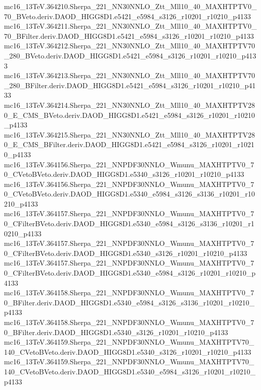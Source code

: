 \begin{scriptsize}
mc16\_13TeV.364210.Sherpa\_221\_NN30NNLO\_Ztt\_Mll10\_40\_MAXHTPTV0\_70\_BVeto.deriv.DAOD\_HIGG8D1.e5421\_e5984\_s3126\_r10201\_r10210\_p4133 \\
mc16\_13TeV.364211.Sherpa\_221\_NN30NNLO\_Ztt\_Mll10\_40\_MAXHTPTV0\_70\_BFilter.deriv.DAOD\_HIGG8D1.e5421\_e5984\_s3126\_r10201\_r10210\_p4133 \\
mc16\_13TeV.364212.Sherpa\_221\_NN30NNLO\_Ztt\_Mll10\_40\_MAXHTPTV70\_280\_BVeto.deriv.DAOD\_HIGG8D1.e5421\_e5984\_s3126\_r10201\_r10210\_p4133 \\
mc16\_13TeV.364213.Sherpa\_221\_NN30NNLO\_Ztt\_Mll10\_40\_MAXHTPTV70\_280\_BFilter.deriv.DAOD\_HIGG8D1.e5421\_e5984\_s3126\_r10201\_r10210\_p4133 \\
mc16\_13TeV.364214.Sherpa\_221\_NN30NNLO\_Ztt\_Mll10\_40\_MAXHTPTV280\_E\_CMS\_BVeto.deriv.DAOD\_HIGG8D1.e5421\_e5984\_s3126\_r10201\_r10210\_p4133 \\
mc16\_13TeV.364215.Sherpa\_221\_NN30NNLO\_Ztt\_Mll10\_40\_MAXHTPTV280\_E\_CMS\_BFilter.deriv.DAOD\_HIGG8D1.e5421\_e5984\_s3126\_r10201\_r10210\_p4133 \\
mc16\_13TeV.364156.Sherpa\_221\_NNPDF30NNLO\_Wmunu\_MAXHTPTV0\_70\_CVetoBVeto.deriv.DAOD\_HIGG8D1.e5340\_s3126\_r10201\_r10210\_p4133 \\
mc16\_13TeV.364156.Sherpa\_221\_NNPDF30NNLO\_Wmunu\_MAXHTPTV0\_70\_CVetoBVeto.deriv.DAOD\_HIGG8D1.e5340\_e5984\_s3126\_s3136\_r10201\_r10210\_p4133 \\
mc16\_13TeV.364157.Sherpa\_221\_NNPDF30NNLO\_Wmunu\_MAXHTPTV0\_70\_CFilterBVeto.deriv.DAOD\_HIGG8D1.e5340\_e5984\_s3126\_s3136\_r10201\_r10210\_p4133 \\
mc16\_13TeV.364157.Sherpa\_221\_NNPDF30NNLO\_Wmunu\_MAXHTPTV0\_70\_CFilterBVeto.deriv.DAOD\_HIGG8D1.e5340\_s3126\_r10201\_r10210\_p4133 \\
mc16\_13TeV.364157.Sherpa\_221\_NNPDF30NNLO\_Wmunu\_MAXHTPTV0\_70\_CFilterBVeto.deriv.DAOD\_HIGG8D1.e5340\_e5984\_s3126\_r10201\_r10210\_p4133 \\
mc16\_13TeV.364158.Sherpa\_221\_NNPDF30NNLO\_Wmunu\_MAXHTPTV0\_70\_BFilter.deriv.DAOD\_HIGG8D1.e5340\_e5984\_s3126\_s3136\_r10201\_r10210\_p4133 \\
mc16\_13TeV.364158.Sherpa\_221\_NNPDF30NNLO\_Wmunu\_MAXHTPTV0\_70\_BFilter.deriv.DAOD\_HIGG8D1.e5340\_s3126\_r10201\_r10210\_p4133 \\
mc16\_13TeV.364159.Sherpa\_221\_NNPDF30NNLO\_Wmunu\_MAXHTPTV70\_140\_CVetoBVeto.deriv.DAOD\_HIGG8D1.e5340\_s3126\_r10201\_r10210\_p4133 \\
mc16\_13TeV.364159.Sherpa\_221\_NNPDF30NNLO\_Wmunu\_MAXHTPTV70\_140\_CVetoBVeto.deriv.DAOD\_HIGG8D1.e5340\_e5984\_s3126\_r10201\_r10210\_p4133 \\

\end{scriptsize}
